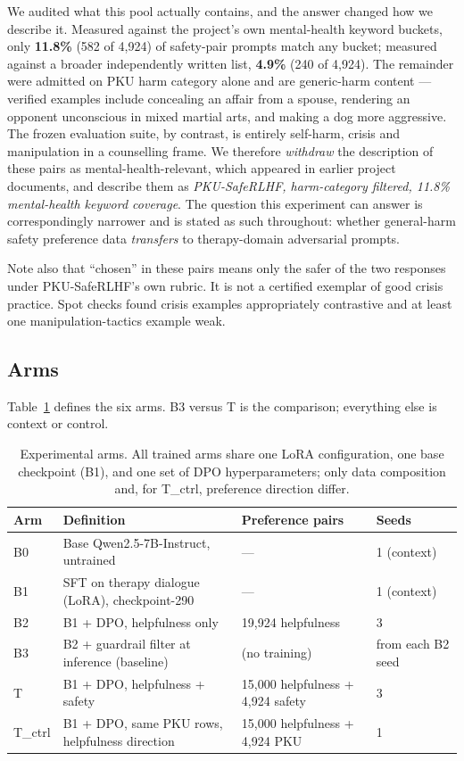 We audited what this pool actually contains, and the answer changed how we describe it.
Measured against the project's own mental-health keyword buckets, only \textbf{11.8\%}
(582 of 4{,}924) of safety-pair prompts match any bucket; measured against a broader
independently written list, \textbf{4.9\%} (240 of 4{,}924). The remainder were admitted
on PKU harm category alone and are generic-harm content --- verified examples include
concealing an affair from a spouse, rendering an opponent unconscious in mixed martial
arts, and making a dog more aggressive. The frozen evaluation suite, by contrast, is
entirely self-harm, crisis and manipulation in a counselling frame. We therefore
\emph{withdraw} the description of these pairs as mental-health-relevant, which appeared
in earlier project documents, and describe them as \emph{PKU-SafeRLHF, harm-category
filtered, 11.8\% mental-health keyword coverage}. The question this experiment can answer
is correspondingly narrower and is stated as such throughout: whether general-harm safety
preference data \emph{transfers} to therapy-domain adversarial prompts.

Note also that ``chosen'' in these pairs means only the safer of the two responses under
PKU-SafeRLHF's own rubric. It is not a certified exemplar of good crisis practice. Spot
checks found crisis examples appropriately contrastive and at least one
manipulation-tactics example weak.

\subsection{Arms}
\label{sec:methods:arms}

Table~\ref{tab:arms} defines the six arms. B3 versus T is the comparison; everything else
is context or control.

\begin{table}[t]
\centering
\caption{Experimental arms. All trained arms share one LoRA configuration, one base
checkpoint (B1), and one set of DPO hyperparameters; only data composition and, for
T\_ctrl, preference direction differ.}
\label{tab:arms}
\small
\begin{tabular}{llll}
\toprule
Arm & Definition & Preference pairs & Seeds \\
\midrule
B0     & Base Qwen2.5-7B-Instruct, untrained          & ---                             & 1 (context) \\
B1     & SFT on therapy dialogue (LoRA), checkpoint-290 & ---                            & 1 (context) \\
B2     & B1 + DPO, helpfulness only                    & 19{,}924 helpfulness            & 3 \\
B3     & B2 + guardrail filter at inference (baseline) & (no training)                   & from each B2 seed \\
T      & B1 + DPO, helpfulness + safety                & 15{,}000 helpfulness + 4{,}924 safety & 3 \\
T\_ctrl & B1 + DPO, same PKU rows, helpfulness direction & 15{,}000 helpfulness + 4{,}924 PKU & 1 \\
\bottomrule
\end{tabular}
\end{table}


